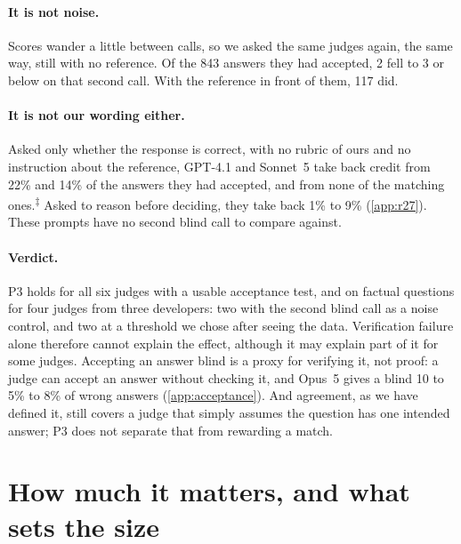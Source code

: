 \documentclass{article}
\newcommand{\reana}{\textsuperscript{$\ddagger$}}
\begin{document}
\paragraph{It is not noise.}
Scores wander a little between calls, so we asked the same judges again, the same way, still with no reference.
Of the 843 answers they had accepted, 2 fell to 3 or below on that second call. With the reference in front of them, 117 did.

\paragraph{It is not our wording either.}
Asked only whether the response is correct, with no rubric of ours and no instruction about the reference, GPT-4.1 and Sonnet~5 take back credit from 22\% and 14\% of the answers they had accepted, and from none of the matching ones.\reana{}
Asked to reason before deciding, they take back 1\% to 9\% (\cref{app:r27}). These prompts have no second blind call to compare against.

\paragraph{Verdict.}
P3 holds for all six judges with a usable acceptance test, and on factual questions for four judges from three developers: two with the second blind call as a noise control, and two at a threshold we chose after seeing the data.
Verification failure alone therefore cannot explain the effect, although it may explain part of it for some judges.
Accepting an answer blind is a proxy for verifying it, not proof: a judge can accept an answer without checking it, and Opus~5 gives a blind 10 to 5\% to 8\% of wrong answers (\cref{app:acceptance}).
And agreement, as we have defined it, still covers a judge that simply assumes the question has one intended answer; P3 does not separate that from rewarding a match.

\section{How much it matters, and what sets the size}
\label{sec:cost}
\end{document}
